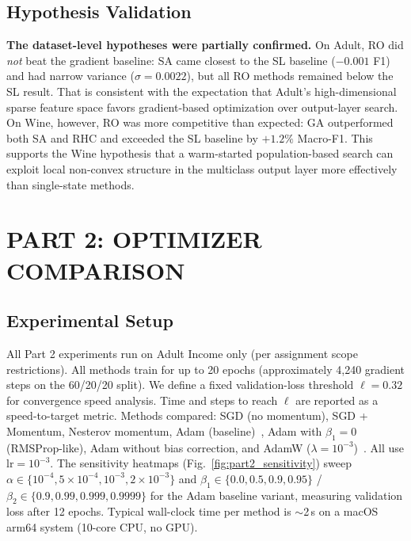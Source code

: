 \documentclass[letterpaper, 10 pt, conference]{ieeeconf}
\begin{document}
\subsection{Hypothesis Validation}

\textbf{The dataset-level hypotheses were partially confirmed.} On Adult, RO did \emph{not} beat the gradient baseline: SA came closest to the SL baseline ($-0.001$ F1) and had narrow variance ($\sigma=0.0022$), but all RO methods remained below the SL result. That is consistent with the expectation that Adult's high-dimensional sparse feature space favors gradient-based optimization over output-layer search. On Wine, however, RO was more competitive than expected: GA outperformed both SA and RHC and exceeded the SL baseline by $+1.2\%$ Macro-F1. This supports the Wine hypothesis that a warm-started population-based search can exploit local non-convex structure in the multiclass output layer more effectively than single-state methods.

\section{PART 2: OPTIMIZER COMPARISON}

\subsection{Experimental Setup}

All Part 2 experiments run on Adult Income only (per assignment scope restrictions). All methods train for up to 20 epochs (approximately 4{,}240 gradient steps on the 60/20/20 split). We define a fixed validation-loss threshold $\ell = 0.32$ for convergence speed analysis. Time and steps to reach $\ell$ are reported as a speed-to-target metric. Methods compared: SGD (no momentum), SGD + Momentum, Nesterov momentum, Adam (baseline)~\cite{kingma2014}, Adam with $\beta_1 = 0$ (RMSProp-like), Adam without bias correction, and AdamW ($\lambda = 10^{-3}$)~\cite{loshchilov2017}. All use $\text{lr} = 10^{-3}$. The sensitivity heatmaps (Fig.~\ref{fig:part2_sensitivity}) sweep $\alpha \in \{10^{-4}, 5 \times 10^{-4}, 10^{-3}, 2 \times 10^{-3}\}$ and $\beta_1 \in \{0.0, 0.5, 0.9, 0.95\}$ / $\beta_2 \in \{0.9, 0.99, 0.999, 0.9999\}$ for the Adam baseline variant, measuring validation loss after 12 epochs. Typical wall-clock time per method is $\sim$2\,s on a macOS arm64 system (10-core CPU, no GPU).
\end{document}
